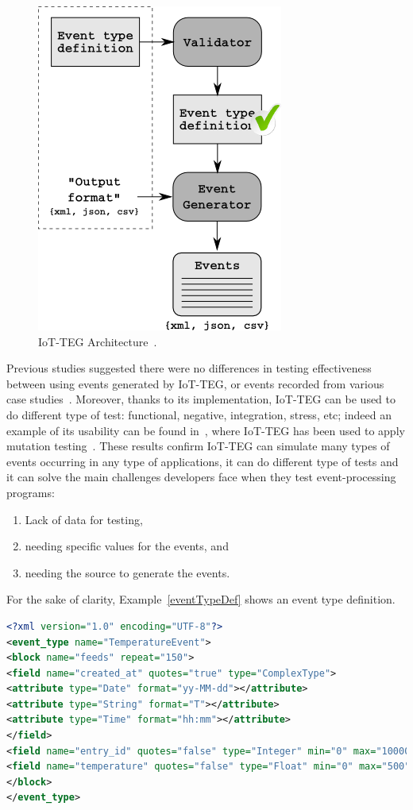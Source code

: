 \documentclass[10pt,journal,compsoc]{IEEEtran}
\begin{document}
\begin{figure}[!ht]
	\centering
	\includegraphics[scale=0.45]{Images/IoT-EGArquitecture}
	\caption[IoT-TEG Architecture]{IoT-TEG Architecture~\cite{TesisGutierrez2017,Gutierrez2017}.}
	\label{fig:IoT-EGArquitecture}
\end{figure}
Previous studies suggested there were no differences in testing effectiveness between using events
generated by IoT-TEG, or events recorded from various case studies~\cite{Gutierrez2017,TesisGutierrez2017}.
Moreover, thanks to its implementation, IoT-TEG can be used to do different type of test: functional,
negative, integration, stress, etc; indeed an example of its usability can be found 
in~\cite{TesisGutierrez2017,gutierrez2018}, where IoT-TEG has been used to apply mutation 
testing~\cite{jia2011}. These results confirm IoT-TEG can 
simulate many types of events occurring in any type of applications, it can do different type of tests
and it can solve the main challenges developers face when they test event-processing programs:
\begin{enumerate}
	\item Lack of data for testing,
	\item needing specific values for the events, and
	\item needing the source to generate the events.
\end{enumerate}

For the sake of clarity, Example~\ref{eventTypeDef} shows an event type
definition.
\begin{lstlisting}[basicstyle=\ttfamily\footnotesize,language=XML,caption=Event type definition example,label=eventTypeDef, breaklines=true]
<?xml version="1.0" encoding="UTF-8"?>
<event_type name="TemperatureEvent">
<block name="feeds" repeat="150">
<field name="created_at" quotes="true" type="ComplexType">
<attribute type="Date" format="yy-MM-dd"></attribute>
<attribute type="String" format="T"></attribute>
<attribute type="Time" format="hh:mm"></attribute>
</field>
<field name="entry_id" quotes="false" type="Integer" min="0" max="10000"></field>
<field name="temperature" quotes="false" type="Float" min="0" max="500" precision="1"></field>
</block>
</event_type>
\end{lstlisting}
\end{document}
